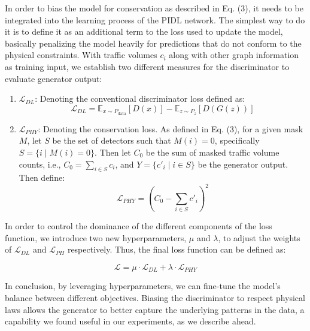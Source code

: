 In order to bias the model for conservation as described in Eq. (3), it needs to be integrated into the learning process of the PIDL network. The simplest way to do it is to define it as an additional term to the loss used to update the model, basically penalizing the model heavily for predictions that do not conform to the physical constraints. With traffic volumes \(c_i\) along with other graph information as training input, we establish two different measures for the discriminator to evaluate generator output:
\begin{enumerate}
    \item \textbf{\( \mathcal{L}_{DL} \)}: Denoting the conventional discriminator loss defined as:
    \[ \mathcal{L}_{DL} = \mathbb{E}_{x \sim P_{\text{data}}}[D(x)] - \mathbb{E}_{z \sim P_z}[D(G(z))] \]

    \item \textbf{\( \mathcal{L}_{PHY} \)}: Denoting the conservation loss. As defined in Eq. (3), for a given mask \( M \), let \( S \) be the set of detectors such that \( M(i) = 0 \), specifically \( S = \{i \mid M(i) = 0\} \). Then let \( C_0 \) be the sum of masked traffic volume counts, i.e., \( C_0 = \sum_{i \in S} c_i \), and \( Y = \{c'_i \mid i \in S\} \) be the generator output. Then define:
    \[ \mathcal{L}_{PHY} = (C_0 - \sum_{i \in S} c'_i)^2 \]
\end{enumerate}
In order to control the dominance of the different components of the loss function, we introduce two new hyperparameters, \( \mu \) and \( \lambda \), to adjust the weights of \( \mathcal{L}_{DL} \) and \( \mathcal{L}_{PH} \) respectively. Thus, the final loss function can be defined as:

\[ \mathcal{L} = \mu \cdot \mathcal{L}_{DL} + \lambda \cdot \mathcal{L}_{PHY} \]

In conclusion, by leveraging hyperparameters, we can fine-tune the model's balance between different objectives. Biasing the discriminator to respect physical laws allows the generator to better capture the underlying patterns in the data, a capability we found useful in our experiments, as we describe ahead.